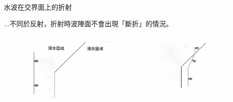 \documentclass[13pt]{beamer}
\begin{document}
\begin{frame}{水波在交界面上的折射}

    ...不同於反射，折射時波陣面不會出現「斷折」的情況。
    \begin{columns}
        \begin{figure}
            \centering
            \includegraphics[width=1\linewidth]{images/Screenshot 2023-09-27 at 8.42.42 PM.png}


        \end{figure}
        \begin{figure}
            \centering
            \includegraphics[width=1\linewidth]{images/Screenshot 2023-09-27 at 8.42.50 PM.png}


        \end{figure}
    \end{columns}
\end{frame}
\end{document}
